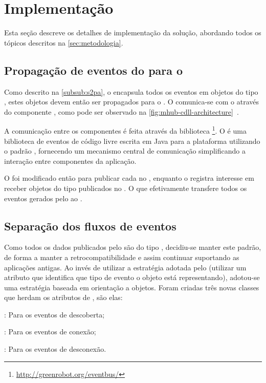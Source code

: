 \section{Implementação}

Esta seção descreve os detalhes de implementação da solução, abordando todos os tópicos descritos na \autoref{sec:metodologia}.

\subsection{Propagação de eventos do \stwopa para o \cddl}

Como descrito na \autoref{subsub:s2pa}, o \mhub encapsula todos os eventos em objetos do tipo \sensordata, estes objetos devem então ser propagados para o \cddl.
O \stwopa comunica-se com o \cddl através do componente \qocevaluator, como pode ser observado na \autoref{fig:mhub-cdll-architecture}~\cite{gomes:2017}.

A comunicação entre os componentes é feita através da biblioteca \eventbus\footnote{\url{http://greenrobot.org/eventbus/}}.
O \eventbus é uma biblioteca de eventos de código livre escrita em Java para a plataforma \android utilizando o padrão \pubsub, fornecendo um mecanismo central de comunicação simplificando a interação entre componentes da aplicação.

O \stwopa foi modificado então para publicar cada \sensordata no \eventbus, enquanto o \qocevaluator registra interesse em receber objetos do tipo \sensordata publicados no \eventbus.
O que efetivamente transfere todos os eventos gerados pelo \stwopa ao \cddl.

\subsection{Separação dos fluxos de eventos}

Como todos os dados publicados pelo \cddl são do tipo \msg, decidiu-se manter este padrão, de forma a manter a retrocompatibilidade e assim continuar suportando as aplicações antigas.
Ao invés de utilizar a estratégia adotada pelo \mhub (utilizar um atributo que identifica que tipo de evento o objeto está representando), adotou-se uma estratégia baseada em orientação a objetos.
Foram criadas três novas classes que herdam os atributos de \msg, são elas:

\begin{alineas}
	\item \objfoundmsg: Para os eventos de descoberta;
	\item \objconnectedmsg: Para os eventos de conexão;
	\item \objdisconnectedmsg: Para os eventos de desconexão.
\end{alineas}

